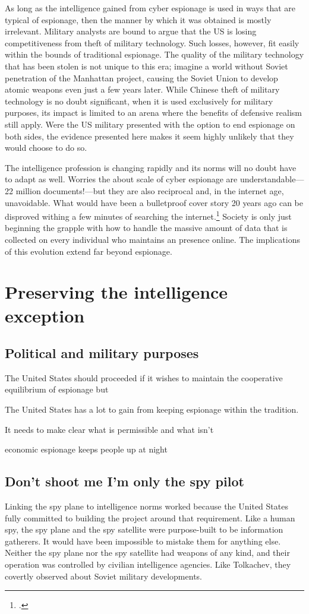 \documentclass{memoir}
\begin{document}
As long as the intelligence gained from cyber espionage is used in ways that are typical of espionage, then the manner by which it was obtained is mostly irrelevant. Military analysts are bound to argue that the US is losing competitiveness from theft of military technology. Such losses, however, fit easily within the bounds of traditional espionage. The quality of the military technology that has been stolen is not unique to this era; imagine a world without Soviet penetration of the Manhattan project, causing the Soviet Union to develop atomic weapons even just a few years later. While Chinese theft of military technology is no doubt significant, when it is used exclusively for military purposes, its impact is limited to an arena where the benefits of defensive realism still apply. Were the US military presented with the option to end espionage on both sides, the evidence presented here makes it seem highly unlikely that they would choose to do so.

The intelligence profession is changing rapidly and its norms will no doubt have to adapt as well. Worries the about scale of cyber espionage are understandable---22 million documents!---but they are also reciprocal and, in the internet age, unavoidable. What would have been a bulletproof cover story 20 years ago can be disproved withing a few minutes of searching the internet.\footcite{lucas_spycraft_2019} Society is only just beginning the grapple with how to handle the massive amount of data that is collected on every individual who maintains an presence online. The implications of this evolution extend far beyond espionage.

\section{Preserving the intelligence exception}
\subsection{Political and military purposes}
The United States should proceeded if it wishes to maintain the cooperative equilibrium of espionage but

The United States has a lot to gain from keeping espionage within the tradition.

It needs to make clear what is permissible and what isn't

economic espionage keeps people up at night



\subsection{Don't shoot me I'm only the spy pilot}
Linking the spy plane to intelligence norms worked because the United States fully committed to building the project around that requirement. Like a human spy, the spy plane and the spy satellite were purpose-built to be information gatherers. It would have been impossible to mistake them for anything else. Neither the spy plane nor the spy satellite had weapons of any kind, and their operation was controlled by civilian intelligence agencies. Like Tolkachev, they covertly observed about Soviet military developments.
\end{document}
